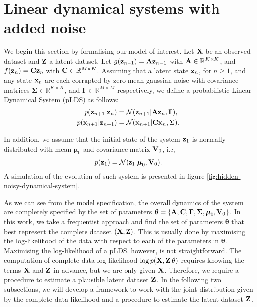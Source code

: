 \documentclass[11pt]{article}
\numberwithin{equation}{section}
\newcommand{\x}{{\bf x}}
\newcommand{\X}{{\bf X}}
\newcommand{\z}{{\bf z}}
\newcommand{\Z}{{\bf Z}}
\newcommand{\N}{\mathcal{N}}
\newcommand{\R}{\mathbb{R}}
\begin{document}
\section{Linear dynamical systems with added noise}
We begin this section by formalising our model of interest. Let $\X$ be an observed dataset and $\Z$ a latent dataset. Let $g(\z_{n-1}) = {\bf A} \z_{n-1}$ with ${\bf A}\in\R^{K\times K}$, and $f(\z_n) = {\bf C} \z_{n}$ with ${\bf C} \in \R^{M \times K}$. Assuming that a latent state $\z_n$, for $n \geq 1$, and any state $\x_n$ are each corrupted by zero-mean gaussian noise with covariance matrices $\boldsymbol{\Sigma} \in \mathbb{R}^{K \times K}$, and $\boldsymbol{\Gamma} \in \mathbb{R}^{M \times M}$ respectively, we define a  probabilistic Linear Dynamical System (pLDS) as follows:
\begin{align}
	p(\z_{n+1} \vert \z_n) &= \N(\z_{n+1} \vert {\bf A}\z_n, \boldsymbol\Gamma),\\
	p(\x_{n+1} \vert \z_{n+1}) &= \N(\x_{n+1} \vert {\bf C}\x_n, \boldsymbol\Sigma).
\end{align}

In addition, we assume that the initial state of the system $\z_1$ is normally distributed with mean $\boldsymbol{\mu}_0$ and covariance matrix ${\bf V}_0$, i.e,
\begin{align}
	p(\z_1) &= \N(\z_1 \vert \boldsymbol\mu_0, {\bf V}_0).\\
\end{align}
A simulation of the evolution of such system is presented in figure \ref{fig:hidden-noisy-dynamical-system}.

As we can see from the model specification, the overall dynamics of the system are completely specified by the set of parameters $\boldsymbol\theta = \{{\bf A}, {\bf C}, \boldsymbol\Gamma, \boldsymbol\Sigma, \boldsymbol\mu_0, {\bf V}_0\}$. In this work, we take a frequentist approach and find the set of parameters $\boldsymbol\theta$ that best represent the complete dataset $(\X, \Z)$. This is usually done by maximising the log-likelihood of the data with respect to each of the parameters in $\boldsymbol{\theta}$. Maximising the log-likelihood of a pLDS, however, is not straightforward. The computation of complete data log-likelihood $\log p(\X, \Z \vert \theta)$ requires knowing the terms $\X$ and $\Z$ in advance, but we are only given $\X$. Therefore, we require a procedure to estimate a plausible latent dataset $\Z$. In the following two subsections, we will develop a framework to work with the joint distribution given by the complete-data likelihood and a procedure to estimate the latent dataset $\Z$.
\end{document}
